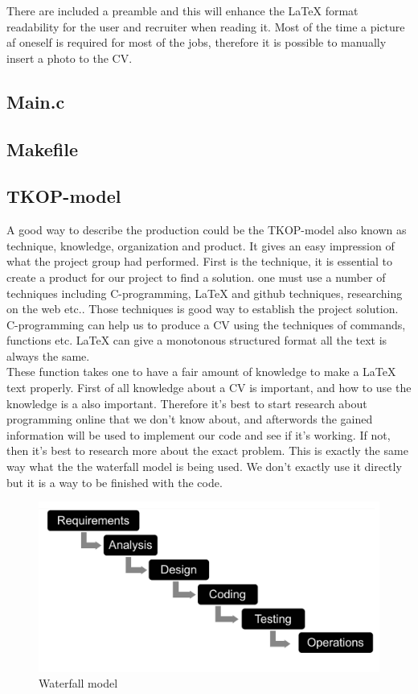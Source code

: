 There are included a preamble and this will enhance the LaTeX format readability for the user and recruiter when reading it. 
Most of the time a picture af oneself is required for most of the jobs, therefore it is possible to manually insert a photo to the CV. 

\subsection{Main.c}
\subsection{Makefile}

\subsection{TKOP-model}
A good way to describe the production could be the TKOP-model also known as technique, knowledge, organization and product.
It gives an easy impression of what the project group had performed.
First is the technique, it is essential to create a product for our project to find a solution. 
one must use a number of techniques including C-programming, LaTeX and github techniques, researching on the web etc..
Those techniques is good way to establish the project solution. C-programming can help us to produce a CV using the techniques
of commands, functions etc. LaTeX can give a monotonous structured format all the text is always the same. \\

These function takes one to have a fair amount of knowledge to make a LaTeX text properly.
First of all knowledge about a CV is important, and how to use the knowledge is a also important.
Therefore it's best to start research about programming online that we don't know about, 
and afterwords the gained information will be used to implement our code and see if it's working. 
If not, then it's best to research more about the exact problem.
This is exactly the same way what the the waterfall model is being used.
We don't exactly use it directly but it is a way to be finished with the code.
\begin{figure}[H]
  \centering
  \includegraphics[scale = 0.2]{figures/vandfald}
  \caption{Waterfall model \cite{Waterfall_model}}
\end{figure}

